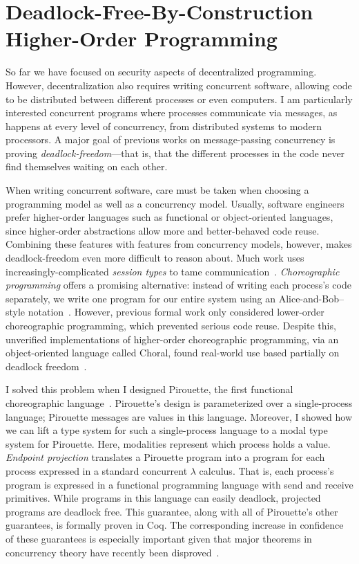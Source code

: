\documentclass{article}
\theoremstyle{definition}
\begin{document}
\section*{Deadlock-Free-By-Construction Higher-Order Programming}

So far we have focused on security aspects of decentralized programming.
However, decentralization also requires writing concurrent software, allowing code to be distributed between different processes or even computers.
I am particularly interested concurrent programs where processes communicate via messages, as happens at every level of concurrency, from distributed systems to modern processors.
A major goal of previous works on message-passing concurrency is proving \emph{deadlock-freedom}---that is, that the different processes in the code never find themselves waiting on each other.

When writing concurrent software, care must be taken when choosing a programming model as well as a concurrency model.
Usually, software engineers prefer higher-order languages such as functional or object-oriented languages, since higher-order abstractions allow more and better-behaved code reuse.
Combining these features with features from concurrency models, however, makes deadlock-freedom even more difficult to reason about.
Much work uses increasingly-complicated \emph{session types} to tame communication~\citep{ScalasY19,HondaYC16}.
\emph{Choreographic programming} offers a promising alternative: instead of writing each process's code separately, we write one program for our entire system using an Alice-and-Bob--style notation~\citep{Montesi13}.
However, previous formal work only considered lower-order choreographic programming, which prevented serious code reuse.
Despite this, unverified implementations of higher-order choreographic programming, via an object-oriented language called Choral, found real-world use based partially on deadlock freedom~\citep{GiallorenzoMP20}.

I solved this problem when I designed Pirouette, the first functional choreographic language~\citep{HirschG22}.
Pirouette's design is parameterized over a single-process language; Pirouette messages are values in this language.
Moreover, I showed how we can lift a type system for such a single-process language to a modal type system for Pirouette.
Here, modalities represent which process holds a value.
\emph{Endpoint projection} translates a Pirouette program into a program for each process expressed in a standard concurrent $\lambda$ calculus.
That is, each process's program is expressed in a functional programming language with \textsf{send} and \textsf{receive} primitives.
While programs in this language can easily deadlock, projected programs are deadlock free.
This guarantee, along with all of Pirouette's other guarantees, is formally proven in Coq.
The corresponding increase in confidence of these guarantees is especially important given that major theorems in concurrency theory have recently been disproved~\citep{Cruz-FilipeMP19}.
\end{document}
